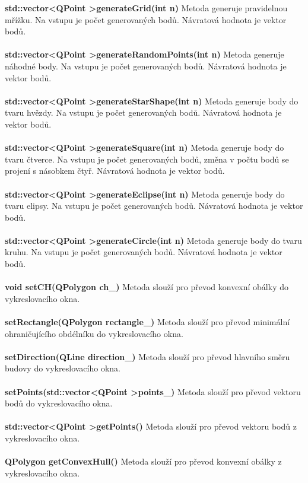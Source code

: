 \documentclass[a4paper, 12pt]{article}
\begin{document}
\textbf{std::vector\textless QPoint \textgreater generateGrid(int n)}
Metoda generuje pravidelnou mřížku. Na vstupu je počet generovaných bodů. Návratová hodnota je vektor bodů.\\
\\
\textbf{std::vector\textless QPoint \textgreater generateRandomPoints(int n)}
Metoda generuje náhodné body. Na vstupu je počet generovaných bodů. Návratová hodnota je vektor bodů.\\
\\
\textbf{std::vector\textless QPoint \textgreater generateStarShape(int n)}
Metoda generuje body do tvaru hvězdy. Na vstupu je počet generovaných bodů. Návratová hodnota je vektor bodů.\\
\\
\textbf{std::vector\textless QPoint \textgreater generateSquare(int n)}
Metoda generuje body do tvaru čtverce. Na vstupu je počet generovaných bodů, změna v počtu bodů se projení s násobkem čtyř. Návratová hodnota je vektor bodů.\\
\\
\textbf{std::vector\textless QPoint \textgreater generateEclipse(int n)}
Metoda generuje body do tvaru elipsy. Na vstupu je počet generovaných bodů. Návratová hodnota je vektor bodů.\\
\\
\textbf{std::vector\textless QPoint \textgreater generateCircle(int n)}
Metoda generuje body do tvaru kruhu. Na vstupu je počet generovaných bodů. Návratová hodnota je vektor bodů.\\
\\
\textbf{void setCH(QPolygon ch\_)}
Metoda slouží pro převod konvexní obálky do vykreslovacího okna.\\
\\
\textbf{setRectangle(QPolygon rectangle\_)}
Metoda slouží pro převod minimální ohraničujícího obdélníku do vykreslovacího okna.\\
\\
\textbf{setDirection(QLine direction\_)}
Metoda slouží pro převod hlavního směru budovy do vykreslovacího okna.\\
\\
\textbf{setPoints(std::vector\textless QPoint \textgreater points\_)}
Metoda slouží pro převod vektoru bodů do vykreslovacího okna.\\
\\
\textbf{std::vector\textless QPoint \textgreater getPoints()}
Metoda slouží pro převod vektoru bodů z vykreslovacího okna.\\
\\
\textbf{QPolygon getConvexHull()}
Metoda slouží pro převod konvexní obálky z vykreslovacího okna.\\
\\
\end{document}
